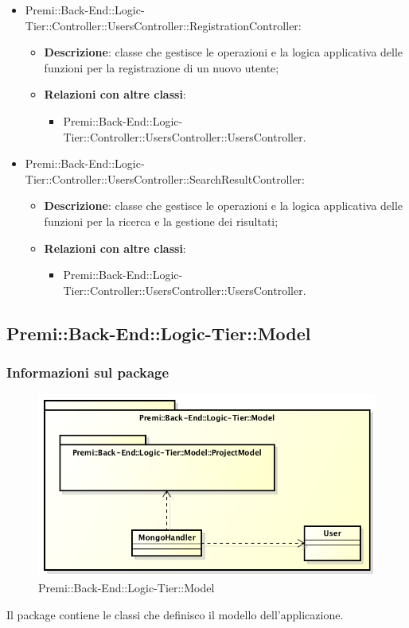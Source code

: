 \begin{itemize}
			\item Premi::Back-End::Logic-Tier::Controller::UsersController::RegistrationController:
			\begin{itemize}
				\item \textbf{Descrizione}: classe che gestisce le operazioni e la logica applicativa delle funzioni per la registrazione di un nuovo utente;
				\item \textbf{Relazioni con altre classi}:
				\begin{itemize}
					\item Premi::Back-End::Logic-Tier::Controller::UsersController::UsersController.
				\end{itemize}
			\end{itemize}
			
			\item Premi::Back-End::Logic-Tier::Controller::UsersController::SearchResultController:
			\begin{itemize}
				\item \textbf{Descrizione}: classe che gestisce le operazioni e la logica applicativa delle funzioni per la ricerca e la gestione dei risultati;
				\item \textbf{Relazioni con altre classi}:
				\begin{itemize}
					\item Premi::Back-End::Logic-Tier::Controller::UsersController::UsersController.
				\end{itemize}
			\end{itemize}
		\end{itemize}

\newpage

\subsection{Premi::Back-End::Logic-Tier::Model}
	\subsubsection*{Informazioni sul package}
		\begin{figure}[h]
			\centering
			\includegraphics[width=0.9\linewidth]{img/back-end_logic-tier_model}
			\caption[Premi::Back-End::Logic-Tier::Model]{Premi::Back-End::Logic-Tier::Model}
		\end{figure}
		Il package contiene le classi che definisco il modello dell'applicazione.
	
